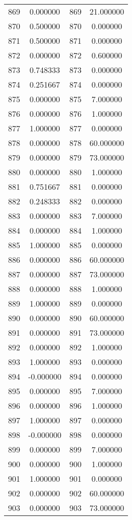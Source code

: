 \documentclass[12pt]{article}
\begin{document}
\begin{longtable}{@{}cccc@{}}
869 & 0.000000 & 869 & 21.000000 \\
870 & 0.500000 & 870 & 0.000000 \\
871 & 0.500000 & 871 & 0.000000 \\
872 & 0.000000 & 872 & 0.600000 \\
873 & 0.748333 & 873 & 0.000000 \\
874 & 0.251667 & 874 & 0.000000 \\
875 & 0.000000 & 875 & 7.000000 \\
876 & 0.000000 & 876 & 1.000000 \\
877 & 1.000000 & 877 & 0.000000 \\
878 & 0.000000 & 878 & 60.000000 \\
879 & 0.000000 & 879 & 73.000000 \\
880 & 0.000000 & 880 & 1.000000 \\
881 & 0.751667 & 881 & 0.000000 \\
882 & 0.248333 & 882 & 0.000000 \\
883 & 0.000000 & 883 & 7.000000 \\
884 & 0.000000 & 884 & 1.000000 \\
885 & 1.000000 & 885 & 0.000000 \\
886 & 0.000000 & 886 & 60.000000 \\
887 & 0.000000 & 887 & 73.000000 \\
888 & 0.000000 & 888 & 1.000000 \\
889 & 1.000000 & 889 & 0.000000 \\
890 & 0.000000 & 890 & 60.000000 \\
891 & 0.000000 & 891 & 73.000000 \\
892 & 0.000000 & 892 & 1.000000 \\
893 & 1.000000 & 893 & 0.000000 \\
894 & -0.000000 & 894 & 0.000000 \\
895 & 0.000000 & 895 & 7.000000 \\
896 & 0.000000 & 896 & 1.000000 \\
897 & 1.000000 & 897 & 0.000000 \\
898 & -0.000000 & 898 & 0.000000 \\
899 & 0.000000 & 899 & 7.000000 \\
900 & 0.000000 & 900 & 1.000000 \\
901 & 1.000000 & 901 & 0.000000 \\
902 & 0.000000 & 902 & 60.000000 \\
903 & 0.000000 & 903 & 73.000000 \\

\end{longtable}
\end{document}

